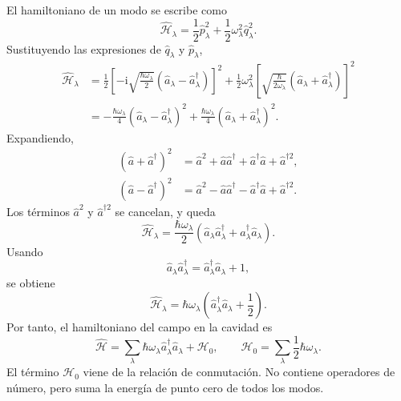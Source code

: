 \documentclass[11pt]{article}
\newcommand{\ii}{\mathrm{i}}
\begin{document}
El hamiltoniano de un modo se escribe como
\begin{equation}
  \hat{\mathcal H}_\lambda
  =
  \frac{1}{2}\hat p_\lambda^2
  +
  \frac{1}{2}\omega_\lambda^2\hat q_\lambda^2.
\end{equation}
Sustituyendo las expresiones de $\hat q_\lambda$ y $\hat p_\lambda$,
\begin{align}
  \hat{\mathcal H}_\lambda
  &=
  \frac{1}{2}
  \left[
  -\ii\sqrt{\frac{\hbar\omega_\lambda}{2}}
  (\hat a_\lambda-\hat a_\lambda^\dagger)
  \right]^2
  +
  \frac{1}{2}\omega_\lambda^2
  \left[
  \sqrt{\frac{\hbar}{2\omega_\lambda}}
  (\hat a_\lambda+\hat a_\lambda^\dagger)
  \right]^2\\
  &=
  -\frac{\hbar\omega_\lambda}{4}
  (\hat a_\lambda-\hat a_\lambda^\dagger)^2
  +
  \frac{\hbar\omega_\lambda}{4}
  (\hat a_\lambda+\hat a_\lambda^\dagger)^2.
\end{align}
Expandiendo,
\begin{align}
  (\hat a+\hat a^\dagger)^2
  &=
  \hat a^2+\hat a\hat a^\dagger
  +
  \hat a^\dagger\hat a
  +
  \hat a^{\dagger 2},\\
  (\hat a-\hat a^\dagger)^2
  &=
  \hat a^2-\hat a\hat a^\dagger
  -
  \hat a^\dagger\hat a
  +
  \hat a^{\dagger 2}.
\end{align}
Los t\'erminos $\hat a^2$ y $\hat a^{\dagger2}$ se cancelan, y queda
\begin{equation}
  \hat{\mathcal H}_\lambda
  =
  \frac{\hbar\omega_\lambda}{2}
  \left(
  \hat a_\lambda\hat a_\lambda^\dagger
  +
  \hat a_\lambda^\dagger\hat a_\lambda
  \right).
\end{equation}
Usando
\begin{equation}
  \hat a_\lambda\hat a_\lambda^\dagger
  =
  \hat a_\lambda^\dagger\hat a_\lambda+1,
\end{equation}
se obtiene
\begin{equation}
  \hat{\mathcal H}_\lambda
  =
  \hbar\omega_\lambda
  \left(
  \hat a_\lambda^\dagger\hat a_\lambda+\frac{1}{2}
  \right).
\end{equation}
Por tanto, el hamiltoniano del campo en la cavidad es
\begin{equation}
  \boxed{
  \hat{\mathcal H}
  =
  \sum_\lambda
  \hbar\omega_\lambda
  \hat a_\lambda^\dagger\hat a_\lambda
  +
  \mathcal H_0,
  \qquad
  \mathcal H_0=
  \sum_\lambda\frac{1}{2}\hbar\omega_\lambda.
  }
\end{equation}
El t\'ermino $\mathcal H_0$ viene de la relaci\'on de conmutaci\'on. No
contiene operadores de n\'umero, pero suma la energ\'ia de punto cero de todos
los modos.
\end{document}
